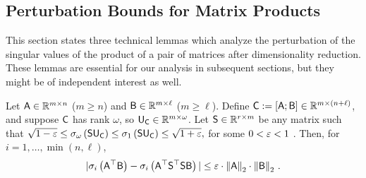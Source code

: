 \subsection{Perturbation Bounds for Matrix Products}\label{sec:pert}
%
This section states three technical lemmas which analyze the perturbation of the singular values of the product of a pair of matrices after dimensionality reduction.
These lemmas are essential for our analysis in subsequent sections, but they might be of independent interest as well.
%
\begin{lemma}\label{lem:pert4}
Let ${\mathsf{A} } \in \mathbb{R}^{m \times n}$ ($m \geq n$)  and ${\mathsf{B} } \in \mathbb{R}^{m \times \ell}$ ($m \geq \ell$). Define ${\mathsf{C} } := [{\mathsf{A} } ; {\mathsf{B} }] \in \mathbb{R}^{m\times(n+\ell)}$, and suppose ${\mathsf{C} }$ has rank $\omega$, so ${\mathsf{U} }_{{\mathsf{C} }}\in\mathbb{R}^{m\times\omega}$.  Let ${\mathsf{S} } \in \mathbb{R}^{r \times m}$ be any matrix such that %
$ \sqrt{1-\varepsilon} \leq \sigma_{\omega}\left({\mathsf{S} } {\mathsf{U} }_{{\mathsf{C} }} \right) \leq \sigma_1\left({\mathsf{S} } {\mathsf{U} }_{{\mathsf{C} }} \right)  \le \sqrt{1+\varepsilon},$ for some $0 < \varepsilon < 1$ . Then, for $i=1,\dots,\min(n,\ell)$,
\[|\sigma_i \left( {\mathsf{A} }^\top{\ensuremath{\mathsf{B} }} \right)  - \sigma_i\left( {\mathsf{A} }^\top {\ensuremath{\mathsf{S} }} ^\top {\ensuremath{\mathsf{S} }} {\ensuremath{\mathsf{B} }} \right)| \le \varepsilon\cdot\left\|{\mathsf{A} }\right\|_2\cdot\left\|{\mathsf{B} }\right\|_2\,.\]
\end{lemma}
%
